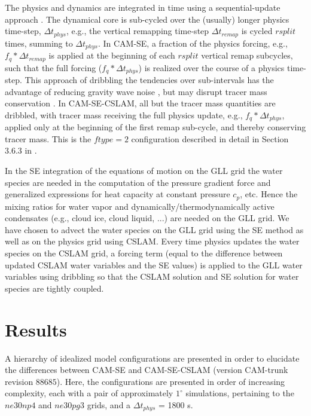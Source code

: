 \documentclass[twocol]{ametsoc}
\begin{document}
{\color{red}The physics and dynamics are integrated in time using a sequential-update approach \citep{LetAl2018JAMES}. The dynamical core is sub-cycled over the (usually) longer physics time-step, $\Delta t_{phys}$, e.g., the vertical remapping time-step $\Delta t_{remap}$ is cycled $rsplit$ times, summing to $\Delta t_{phys}$. In CAM-SE, a fraction of the physics forcing, e.g., $f_q * \Delta t_{remap}$ is applied at the beginning of each $rsplit$ vertical remap subcycles, such that the full forcing ($f_q * \Delta t_{phys}$) is realized over the course of a physics time-step. This approach of dribbling the tendencies over sub-intervals has the advantage of reducing gravity wave noise \citep{TJ2016GMD}, but may disrupt tracer mass conservation \citep{water-leak}. In CAM-SE-CSLAM, all but the tracer mass quantities are dribbled, with tracer mass receiving the full physics update, e.g., $f_q * \Delta t_{phys}$, applied only at the beginning of the first remap sub-cycle, and thereby conserving tracer mass. This is the $ftype=2$ configuration described in detail in Section 3.6.3 in \cite{LetAl2018JAMES}.

In the SE integration of the equations of motion on the GLL grid the water species are needed in the computation of the pressure gradient force and generalized expressions for heat capacity at constant pressure $c_p$, etc. Hence the mixing ratios for water vapor and dynamically/thermodynamically active condensates (e.g., cloud ice, cloud liquid, ...) are needed on the GLL grid. We have chosen to advect the water species on the GLL grid using the SE method as well as on the physics grid using CSLAM. Every time physics updates the water species on the CSLAM grid, a forcing term (equal to the difference between updated CSLAM water variables and the SE values) is applied to the GLL water variables using dribbling so that the CSLAM solution and SE solution for water species are tightly coupled. 
}

\section{Results}\label{sec:results}

{\color{red}A hierarchy of idealized model configurations are presented in order to elucidate the differences between CAM-SE and CAM-SE-CSLAM (version CAM-trunk revision $88685$). Here, the configurations are presented in order of increasing complexity, each with a pair of approximately $1^{\circ}$ simulations, pertaining to the $ne30np4$ and $ne30pg3$ grids, and a $\Delta t_{phys}$ = 1800 s.{}}
\end{document}
